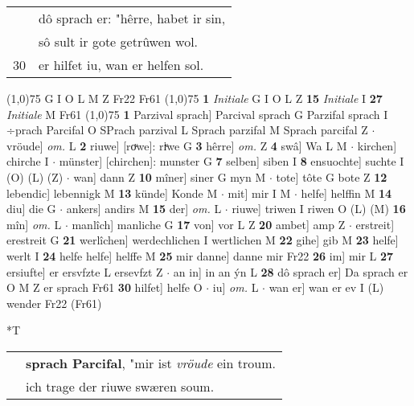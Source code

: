 \documentclass[8pt,a4paper,notitlepage]{article}
\begin{document}
\begin{table}[ht]
\begin{minipage}[t]{0.5\linewidth}
\begin{tabular}{rl}
 & dô sprach er: "hêrre, habet ir sin,\\ 
 & sô sult ir gote getrûwen wol.\\ 
30 & er hilfet iu, wan er helfen sol.\\ 
\end{tabular}
\scriptsize
\line(1,0){75} \newline
G I O L M Z Fr22 Fr61 \newline
\line(1,0){75} \newline
\textbf{1} \textit{Initiale} G I O L Z  \textbf{15} \textit{Initiale} I  \textbf{27} \textit{Initiale} M Fr61  \newline
\line(1,0){75} \newline
\textbf{1} Parzival sprach] Parcival sprach G Parzifal sprach I ÷prach Parcifal O SPrach parzival L Sprach parzifal M Sprach parcifal Z  $\cdot$ vröude] \textit{om.} L \textbf{2} riuwe] [roͮwe]: riͮwe G \textbf{3} hêrre] \textit{om.} Z \textbf{4} swâ] Wa L M  $\cdot$ kirchen] chirche I  $\cdot$ münster] [chirchen]: munster G \textbf{7} selben] siben I \textbf{8} ensuochte] suchte I (O) (L) (Z)  $\cdot$ wan] dann Z \textbf{10} mîner] siner G myn M  $\cdot$ tote] tôte G bote Z \textbf{12} lebendic] lebennigk M \textbf{13} künde] Konde M  $\cdot$ mit] mir I M  $\cdot$ helfe] helffin M \textbf{14} diu] die G  $\cdot$ ankers] andirs M \textbf{15} der] \textit{om.} L  $\cdot$ riuwe] triwen I riwen O (L) (M) \textbf{16} mîn] \textit{om.} L  $\cdot$ manlîch] manliche G \textbf{17} von] vor L Z \textbf{20} ambet] amp Z  $\cdot$ erstreit] erestreit G \textbf{21} werlîchen] werdechlichen I wertlichen M \textbf{22} gihe] gib M \textbf{23} helfe] werlt I \textbf{24} helfe helfe] helffe M \textbf{25} mir danne] danne mir Fr22 \textbf{26} im] mir L \textbf{27} ersiufte] er ersvfzte L ersevfzt Z  $\cdot$ an in] in an ýn L \textbf{28} dô sprach er] Da sprach er O M Z er sprach Fr61 \textbf{30} hilfet] helfe O  $\cdot$ iu] \textit{om.} L  $\cdot$ wan er] wan er ev I (L) wender Fr22 (Fr61) \newline
\end{minipage}
\hspace{0.5cm}
\begin{minipage}[t]{0.5\linewidth}
\small
\begin{center}*T
\end{center}
\begin{tabular}{rl}
 & \textbf{sprach Parcifal}, "mir ist \textit{vröude} ein troum.\\ 
 & ich trage der riuwe swæren soum.\\ 

\end{tabular}
\end{minipage}
\end{table}
\end{document}
